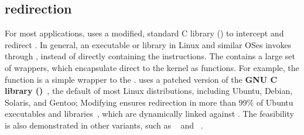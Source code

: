 



\subsection{\Linuxapi{} redirection}

For most applications,
\thelibos{} 
uses a modified, standard C library (\libc{}) to intercept and redirect \linuxapis{}.
In general, an executable or library in Linux and similar OSes invokes \linuxapis{} through \libc{},
instead of directly containing the  instructions.
The \libc{}
contains a large set of \linuxapi{} wrappers,
which encapsulate direct \linuxapis{} to the kernel as functions.
For example, the \libc{} function  is a simple wrapper to the  \linuxapi{}.
\thelibos{} uses a patched version
of the {\bf GNU C library (\glibc{})}~\cite{glibc},
the default \libc{} of most Linux distributions, including Ubuntu, Debian, Solaris, and Gentoo;
Modifying \glibc{}
ensures
\linuxapi{} redirection
in more than 99\% of Ubuntu executables and libraries~\cite{tsai16apistudy},
which are dynamically linked against \glibc{}.
The feasibility is also demonstrated
in other \libc{} variants,
such as ~\cite{uclibc} and ~\cite{musl}. 



